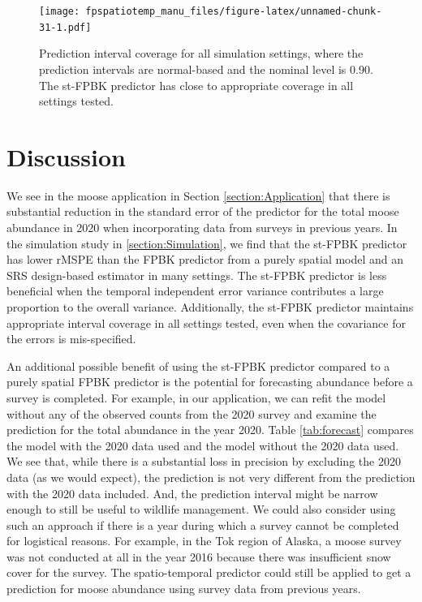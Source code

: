 \documentclass[]{interact}
\theoremstyle{plain}%
\theoremstyle{definition}
\theoremstyle{remark}
\begin{document}
\begin{figure}
\centering
\texttt{[image: fpspatiotemp\_manu\_files/figure-latex/unnamed-chunk-31-1.pdf]}
\caption{\label{fig:pi} Prediction interval coverage for all simulation
settings, where the prediction intervals are normal-based and the
nominal level is 0.90. The st-FPBK predictor has close to appropriate
coverage in all settings tested.}
\end{figure}

\section{Discussion} \label{section:Discussion}

We see in the moose application in Section \ref{section:Application}
that there is substantial reduction in the standard error of the
predictor for the total moose abundance in 2020 when incorporating data
from surveys in previous years. In the simulation study in
\ref{section:Simulation}, we find that the st-FPBK predictor has lower
rMSPE than the FPBK predictor from a purely spatial model and an SRS
design-based estimator in many settings. The st-FPBK predictor is less
beneficial when the temporal independent error variance contributes a
large proportion to the overall variance. Additionally, the st-FPBK
predictor maintains appropriate interval coverage in all settings
tested, even when the covariance for the errors is mis-specified.

An additional possible benefit of using the st-FPBK predictor compared
to a purely spatial FPBK predictor is the potential for forecasting
abundance before a survey is completed. For example, in our application,
we can refit the model without any of the observed counts from the 2020
survey and examine the prediction for the total abundance in the year
2020. Table \ref{tab:forecast} compares the model with the 2020 data
used and the model without the 2020 data used. We see that, while there
is a substantial loss in precision by excluding the 2020 data (as we
would expect), the prediction is not very different from the prediction
with the 2020 data included. And, the prediction interval might be
narrow enough to still be useful to wildlife management. We could also
consider using such an approach if there is a year during which a survey
cannot be completed for logistical reasons. For example, in the Tok
region of Alaska, a moose survey was not conducted at all in the year
2016 because there was insufficient snow cover for the survey. The
spatio-temporal predictor could still be applied to get a prediction for
moose abundance using survey data from previous years.
\end{document}
